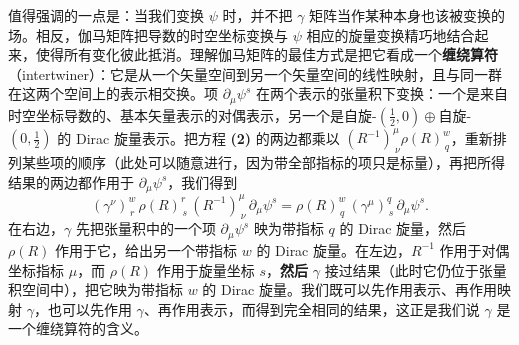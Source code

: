 值得强调的一点是：当我们变换 $\psi$ 时，并不把 $\gamma$ 矩阵当作某种本身也该被变换的场。相反，伽马矩阵把导数的时空坐标变换与 $\psi$ 相应的旋量变换精巧地结合起来，使得所有变化彼此抵消。理解伽马矩阵的最佳方式是把它看成一个\textbf{缠绕算符}（intertwiner）：它是从一个矢量空间到另一个矢量空间的线性映射，且与同一群在这两个空间上的表示相交换。项 $\partial_{\mu}\psi^{s}$ 在两个表示的张量积下变换：一个是来自时空坐标导数的、基本矢量表示的对偶表示，另一个是自旋-$(\tfrac12,0)\oplus$自旋-$(0,\tfrac12)$ 的 Dirac 旋量表示。把方程 \textbf{(2)} 的两边都乘以 $(R^{-1})^{\mu}_{\ \nu}\rho(R)^{w}_{\,q}$，重新排列某些项的顺序（此处可以随意进行，因为带全部指标的项只是标量），再把所得结果的两边都作用于 $\partial_{\mu}\psi^{s}$，我们得到
\begin{equation}
(\gamma^{\nu})^{w}_{\,r}\,\rho(R)^{r}_{\,s}\,(R^{-1})^{\mu}_{\ \nu}\,\partial_{\mu}\psi^{s}
=\rho(R)^{w}_{\,q}\,(\gamma^{\mu})^{q}_{\,s}\,\partial_{\mu}\psi^{s}. \tag{6}
\end{equation}
在右边，$\gamma$ 先把张量积中的一个项 $\partial_{\mu}\psi^{s}$ 映为带指标 $q$ 的 Dirac 旋量，然后 $\rho(R)$ 作用于它，给出另一个带指标 $w$ 的 Dirac 旋量。在左边，$R^{-1}$ 作用于对偶坐标指标 $\mu$，而 $\rho(R)$ 作用于旋量坐标 $s$，\textbf{然后} $\gamma$ 接过结果（此时它仍位于张量积空间中），把它映为带指标 $w$ 的 Dirac 旋量。我们既可以先作用表示、再作用映射 $\gamma$，也可以先作用 $\gamma$、再作用表示，而得到完全相同的结果，这正是我们说 $\gamma$ 是一个缠绕算符的含义。

